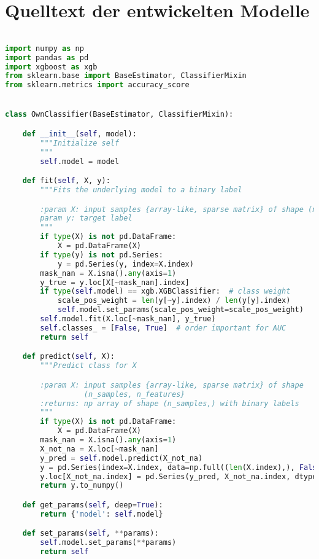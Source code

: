 \chapter{Quelltext der entwickelten Modelle}

\begin{lstlisting}[language=Python, basicstyle=\scriptsize, tabsize=4]

import numpy as np
import pandas as pd
import xgboost as xgb
from sklearn.base import BaseEstimator, ClassifierMixin
from sklearn.metrics import accuracy_score


class OwnClassifier(BaseEstimator, ClassifierMixin):

    def __init__(self, model):
        """Initialize self
        """
        self.model = model

    def fit(self, X, y):
        """Fits the underlying model to a binary label

        :param X: input samples {array-like, sparse matrix} of shape (n_samples, n_features}
        param y: target label
        """
        if type(X) is not pd.DataFrame:
            X = pd.DataFrame(X)
        if type(y) is not pd.Series:
            y = pd.Series(y, index=X.index)
        mask_nan = X.isna().any(axis=1)
        y_true = y.loc[X[~mask_nan].index]
        if type(self.model) == xgb.XGBClassifier:  # class weight
            scale_pos_weight = len(y[~y].index) / len(y[y].index)
            self.model.set_params(scale_pos_weight=scale_pos_weight)
        self.model.fit(X.loc[~mask_nan], y_true)
        self.classes_ = [False, True]  # order important for AUC
        return self

    def predict(self, X):
        """Predict class for X

        :param X: input samples {array-like, sparse matrix} of shape
        		  (n_samples, n_features}
        :returns: np array of shape (n_samples,) with binary labels
        """
        if type(X) is not pd.DataFrame:
            X = pd.DataFrame(X)
        mask_nan = X.isna().any(axis=1)
        X_not_na = X.loc[~mask_nan]
        y_pred = self.model.predict(X_not_na)
        y = pd.Series(index=X.index, data=np.full((len(X.index),), False), name='pred')
        y.loc[X_not_na.index] = pd.Series(y_pred, X_not_na.index, dtype=bool)
        return y.to_numpy()

    def get_params(self, deep=True):
        return {'model': self.model}

    def set_params(self, **params):
        self.model.set_params(**params)
        return self


\end{lstlisting}
